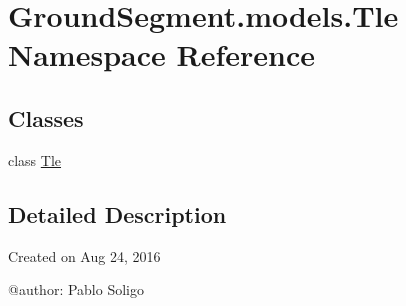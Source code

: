 \hypertarget{namespace_ground_segment_1_1models_1_1_tle}{}\section{Ground\+Segment.\+models.\+Tle Namespace Reference}
\label{namespace_ground_segment_1_1models_1_1_tle}
\subsection*{Classes}
\begin{DoxyCompactItemize}
\item 
class \hyperlink{class_ground_segment_1_1models_1_1_tle_1_1_tle}{Tle}
\end{DoxyCompactItemize}


\subsection{Detailed Description}
\begin{DoxyVerb}Created on Aug 24, 2016

@author: Pablo Soligo
\end{DoxyVerb}
 